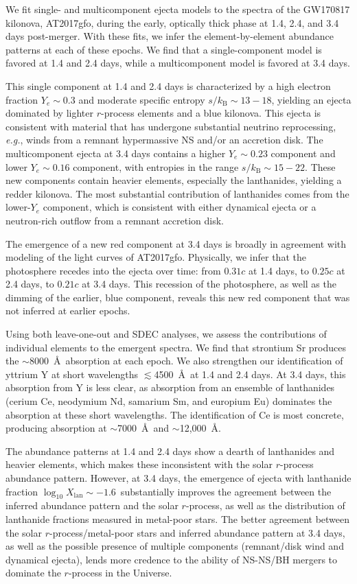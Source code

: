 \documentclass[twocolumn,twocolappendix]{aastex63}
\def\eg{{\it e.g.}}
\begin{document}
{{{{{{{{We fit single- and multicomponent ejecta models to the spectra of the GW170817 kilonova, AT2017gfo, during the early, optically thick phase at 1.4, 2.4, and 3.4 days post-merger. With these fits, we infer the element-by-element abundance patterns at each of these epochs. We find that a single-component model is favored at 1.4 and 2.4 days, while a multicomponent model is favored at 3.4 days. 

This single component at 1.4 and 2.4 days is characterized by a high electron fraction $Y_e \sim 0.3$ and moderate specific entropy $s / k_{\mathrm{B}} \sim 13 - 18$, yielding an ejecta dominated by lighter $r$-process elements and a blue kilonova. This ejecta is consistent with material that has undergone substantial neutrino reprocessing, \eg, winds from a remnant hypermassive NS and/or an accretion disk. The multicomponent ejecta at 3.4 days contains a higher $Y_e \sim 0.23$ component and lower $Y_e \sim 0.16$ component, with entropies in the range $s / k_{\mathrm{B}}\sim 15 - 22$. These new components contain heavier elements, especially the lanthanides, yielding a redder kilonova. The most substantial contribution of lanthanides comes from the lower-$Y_e$ component, which is consistent with either dynamical ejecta or a neutron-rich outflow from a remnant accretion disk. 

The emergence of a new red component at 3.4 days is broadly in agreement with modeling of the light curves of AT2017gfo. Physically, we infer that the photosphere recedes into the ejecta over time: from $0.31c$ at 1.4 days, to $0.25c$ at 2.4 days, to $0.21c$ at 3.4 days. This recession of the photosphere, as well as the dimming of the earlier, blue component, reveals this new red component that was not inferred at earlier epochs. 

Using both leave-one-out and SDEC analyses, we assess the contributions of individual elements to the emergent spectra. We find that strontium Sr produces the $\sim$8000~\AA~absorption at each epoch. We also strengthen our identification of yttrium Y at short wavelengths $\lesssim$4500~\AA~at 1.4 and 2.4 days. At 3.4 days, this absorption from Y is less clear, as absorption from an ensemble of lanthanides (cerium Ce, neodymium Nd, samarium Sm, and europium Eu) dominates the absorption at these short wavelengths. The identification of Ce is most concrete, producing absorption at $\sim$7000~\AA~and $\sim$12,000~\AA.

The abundance patterns at 1.4 and 2.4 days show a dearth of lanthanides and heavier elements, which makes these inconsistent with the solar $r$-process abundance pattern. However, at 3.4 days, the emergence of ejecta with lanthanide fraction $\log_{\mathrm{10}} X_{\mathrm{lan}} \sim -1.6$~substantially improves the agreement between the inferred abundance pattern and the solar $r$-process, as well as the distribution of lanthanide fractions measured in metal-poor stars. The better agreement between the solar $r$-process/metal-poor stars and inferred abundance pattern at 3.4 days, as well as the possible presence of multiple components (remnant/disk wind and dynamical ejecta), lends more credence to the ability of NS-NS/BH mergers to dominate the $r$-process in the Universe. 

}}}}}}}}
\end{document}
